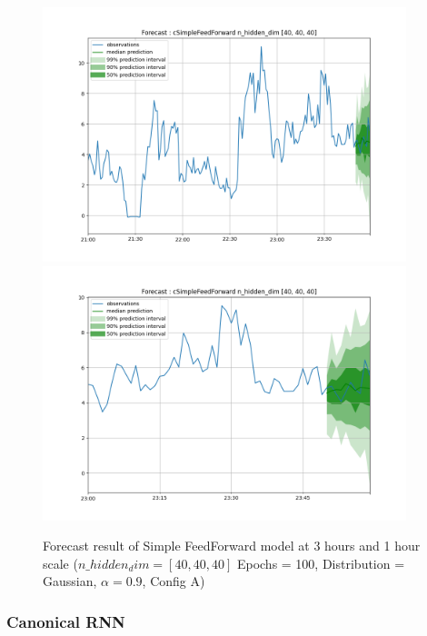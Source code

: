 \documentclass[a4paper, 12pt]{article}
\begin{document}
\begin{figure}[!h]
    \centering
    \includegraphics[width=400px]{plots/forecast/a/cSimpleFeedForward/n_hidden_dim/[40, 40, 40]/180.png}
    \includegraphics[width=400px]{plots/forecast/a/cSimpleFeedForward/n_hidden_dim/[40, 40, 40]/60.png}
    \caption{Forecast result of Simple FeedForward model at 3 hours and 1 hour scale ($n\_hidden_dim = [40,40,40]$ Epochs = 100, Distribution = Gaussian, $\alpha = 0.9$, Config A)}
    \label{fig:feedfordward}
\end{figure}

\subsubsection{Canonical RNN} \label{comp_canonicalrnn}
\end{document}
